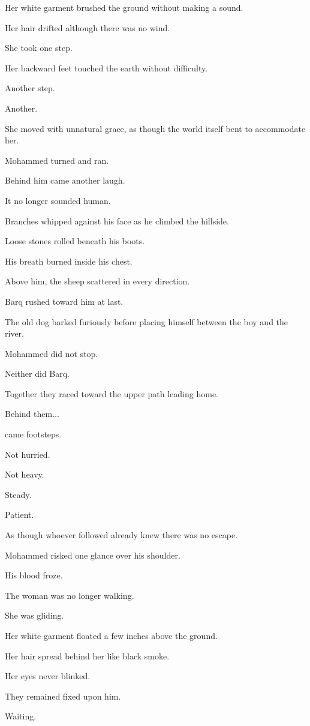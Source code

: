 \documentclass[12pt,openany]{book}
\begin{document}
Her white garment brushed the ground without making a sound.

Her hair drifted although there was no wind.

She took one step.

Her backward feet touched the earth without difficulty.

Another step.

Another.

She moved with unnatural grace, as though the world itself bent to accommodate her.

Mohammed turned and ran.

Behind him came another laugh.

It no longer sounded human.

Branches whipped against his face as he climbed the hillside.

Loose stones rolled beneath his boots.

His breath burned inside his chest.

Above him, the sheep scattered in every direction.

Barq rushed toward him at last.

The old dog barked furiously before placing himself between the boy and the river.

Mohammed did not stop.

Neither did Barq.

Together they raced toward the upper path leading home.

Behind them...

came footsteps.

Not hurried.

Not heavy.

Steady.

Patient.

As though whoever followed already knew there was no escape.

Mohammed risked one glance over his shoulder.

His blood froze.

The woman was no longer walking.

She was gliding.

Her white garment floated a few inches above the ground.

Her hair spread behind her like black smoke.

Her eyes never blinked.

They remained fixed upon him.

Waiting.
\end{document}
